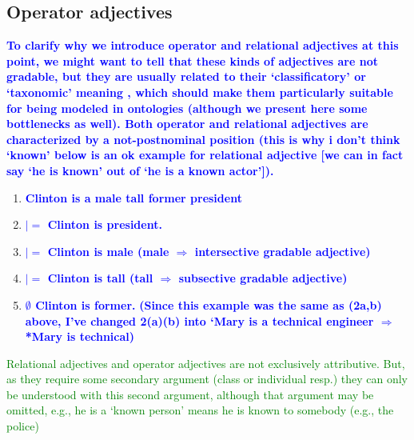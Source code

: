 \documentclass[11pt]{article}
\begin{document}
\subsection{Operator adjectives} \label{sec:operators}

\textbf{\textcolor{blue}{To clarify why we introduce operator and relational adjectives at this point, we might want to tell that these kinds of adjectives are not gradable, but they are usually related to their `classificatory' or `taxonomic' meaning \cite{mcnally2004relational}, which should make them particularly suitable for being modeled in ontologies (although we present here some bottlenecks as well). Both operator and relational adjectives are characterized by a not-postnominal position (this is why i don't think `known' below is an ok example for relational adjective [we can in fact say `he is known' out of `he is a known actor']).}}

\begin{enumerate}
\item \textbf{\textcolor{blue}{Clinton is a male tall former president}} \label{ex:clinton}
\item \textbf{\textcolor{blue}{$ |= $ Clinton is president.}}
\item \textbf{\textcolor{blue}{$ |= $ Clinton is male (male $\Rightarrow$ intersective gradable adjective)}}
\item \textbf{\textcolor{blue}{$ |= $ Clinton is tall (tall $ \Rightarrow$ subsective gradable adjective)}}
\item \textbf{\textcolor{blue}{$\emptyset$ Clinton is former.}} \textbf{\textcolor{blue}{(Since this example was the same as (2a,b) above, I've changed 2(a)(b) into `Mary is a technical engineer $\Rightarrow$ *Mary is technical)}}
\end{enumerate}
\textcolor{green}{Relational adjectives and operator adjectives are not exclusively attributive. But,
    as they require some secondary argument (class or individual resp.) they can only be understood
    with this second argument, although that argument may be omitted, e.g., he is a `known person' means
he is known to somebody (e.g., the police)}
\end{document}
